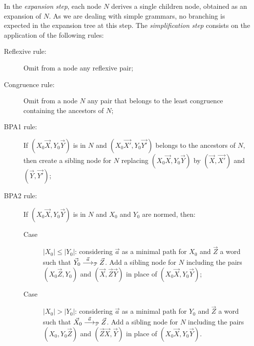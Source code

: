 In the \emph{expansion step}, each node $N$ derives a single children
node, obtained as an expansion of $N$. As we are dealing with simple
grammars, no branching is expected in the expansion tree at this
step.
%
The \emph{simplification step} consists on the application of the
following rules:
%
\begin{description}
\item[Reflexive rule:] Omit from a node any reflexive pair;
\item[Congruence rule:] Omit from a node $N$ any pair that belongs to
  the least congruence containing the ancestors of $N$;
\item[BPA1 rule:] If $(X_0 \vec X, Y_0 \vec Y)$ is in
  $N$ and $(X_0 \vec {X'}, Y_0 \vec {Y'})$ belongs to the ancestors of
  $N$, then create a sibling node for $N$ replacing
  $(X_0 \vec X, Y_0 \vec Y)$ by $(\vec X, \vec {X'})$ and
  $(\vec Y, \vec {Y'})$;
\item[BPA2 rule:] If $(X_0 \vec X, Y_0 \vec Y)$ is in $N$
  and $X_0$ and $Y_0$ are normed, then:
  \begin{description}
  \item[Case] $|X_0| \leq |Y_0|$: considering $\vec a$ as a minimal path
    for $X_0$ and $\vec Z$ a word such that
    $\vec Y_0 \LTSderivesP[\vec a] \vec Z$. Add a sibling node for
    $N$ including the pairs $(X_0 \vec Z, Y_0)$ and
    $(\vec X, \vec Z \vec Y)$ in place of $(X_0 \vec X, Y_0 \vec Y)$;
  \item[Case] $|X_0| > |Y_0|$: considering $\vec a$ as a minimal path for
    $Y_0$ and $\vec Z$ a word such that $\vec X_0 \LTSderivesP[\vec a] \vec
    Z$. Add a sibling node for $N$ including the pairs
    $(X_0 , Y_0 \vec Z )$ and $(\vec Z\vec X, \vec Y)$ in place of
    $(X_0 \vec X, Y_0 \vec Y)$.
  \end{description}
\end{description}


